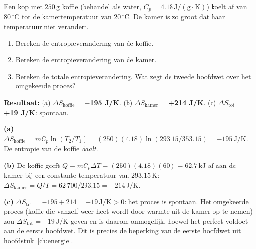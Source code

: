 \begin{oefening}
Een kop met \(250\,\mathrm{g}\) koffie (behandel als water, \(C_p = 4.18\,\mathrm{J/(g\cdot K)}\)) koelt af van \(80\,^\circ\mathrm{C}\) tot de kamertemperatuur van \(20\,^\circ\mathrm{C}\). De kamer is zo groot dat haar temperatuur niet verandert.

\begin{enumerate}
\item[(a)]
  Bereken de entropieverandering van de koffie.
\item[(b)]
  Bereken de entropieverandering van de kamer.
\item[(c)]
  Bereken de totale entropieverandering. Wat zegt de tweede hoofdwet over het omgekeerde proces?
\end{enumerate}
\end{oefening}
\begin{oplossing}
\textbf{Resultaat:} (a) \(\Delta S_{\text{koffie}}\) = \textbf{\ensuremath{-}195 J/K}. (b) \(\Delta S_{\text{kamer}}\) = \textbf{+214 J/K}. (c) \(\Delta S_{\text{tot}}\) = \textbf{+19 J/K}: spontaan.

\textbf{(a)} \(\Delta S_{\text{koffie}} = mC_p\ln(T_2/T_1) = (250)(4.18)\ln(293.15/353.15) = -195\,\mathrm{J/K}\). De entropie van de koffie \emph{daalt}.

\textbf{(b)} De koffie geeft \(Q = mC_p\Delta T = (250)(4.18)(60) = 62.7\,\mathrm{kJ}\) af aan de kamer bij een constante temperatuur van \(293.15\,\mathrm{K}\): \(\Delta S_{\text{kamer}} = Q/T = 62\,700/293.15 = +214\,\mathrm{J/K}\).

\textbf{(c)} \(\Delta S_{\text{tot}} = -195 + 214 = +19\,\mathrm{J/K} > 0\): het proces is spontaan. Het omgekeerde proces (koffie die vanzelf weer heet wordt door warmte uit de kamer op te nemen) zou \(\Delta S_{\text{tot}} = -19\,\mathrm{J/K}\) geven en is daarom onmogelijk, hoewel het perfect voldoet aan de eerste hoofdwet. Dit is precies de beperking van de eerste hoofdwet uit hoofdstuk~\ref{ch:energie}.
\end{oplossing}

